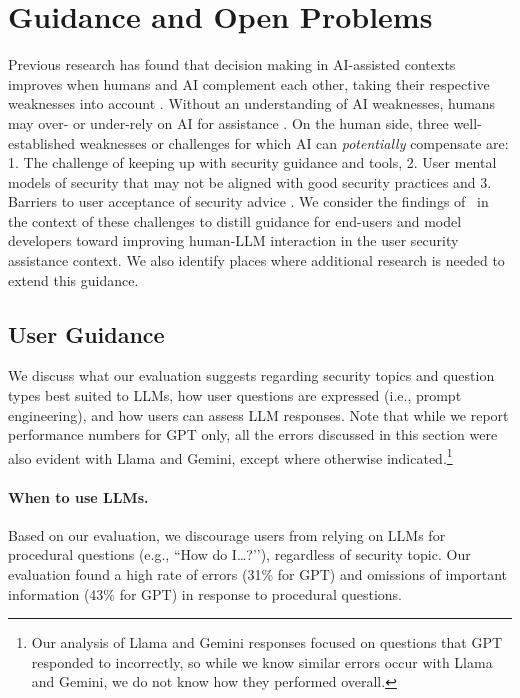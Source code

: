 \section{Guidance and Open Problems}
\label{sec:discussion}

Previous research has found that decision making in AI-assisted contexts improves when humans and AI complement each other, taking their respective weaknesses into account \cite{bansal2019beyond}. Without an understanding of AI weaknesses, humans may over- or under-rely on AI for assistance \cite{schoeffer2024ai}. On the human side, three well-established weaknesses or challenges for which AI can \textit{potentially} compensate are: 1. The challenge of keeping up with security guidance and tools, 2. User mental models of security that may not be aligned with good security practices \cite{wash2011influencing} and 3. Barriers to user acceptance of security advice \cite{redmiles2016learned}.  We consider the findings of~  in the context of these challenges to distill guidance for end-users and model developers toward improving human-LLM interaction in the user security assistance context. We also identify places where additional research is needed to extend this guidance.

\subsection{User Guidance}

We discuss what our evaluation suggests regarding security topics and question types best suited to LLMs, how user questions are expressed (i.e., prompt engineering), and how users can assess LLM responses. Note that while we report performance numbers for GPT only, all the errors discussed in this section were also evident with Llama and Gemini, except where otherwise indicated.\footnote{Our analysis of Llama and Gemini responses focused on questions that GPT responded to incorrectly, so while we know similar errors occur with Llama and Gemini, we do not know how they performed overall.}

\paragraph{When to use LLMs.} Based on our evaluation, we discourage users from relying on LLMs for procedural questions (e.g., ``How do I…?’’), regardless of security topic. Our evaluation found a high rate of errors (31\% for GPT) and omissions of important information (43\% for GPT) in response to procedural questions.

